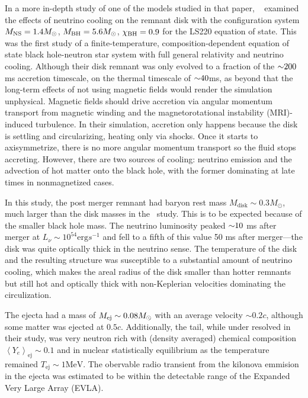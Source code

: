 In a more in-depth study of one of the models studied in that paper, ~\cite{Deaton2013} examined the effects of neutrino cooling on the remnant disk with the configuration system $M_{\rm NS} = 1.4 M_\odot$, $M_{\rm BH} = 5.6 M_\odot$, $\chi_{\rm BH} = 0.9$ for the LS220 equation of state.  
This was the first study of a finite-temperature, composition-dependent equation of state black hole-neutron star system with full general relativity and neutrino cooling.  
Although their disk remnant was only evolved to a fraction of the $\mathord{\sim} 200$ms accretion timescale, on the thermal timescale of $\mathord{\sim} 40$ms, as beyond that the long-term effects of not using magnetic fields would render the simulation unphysical.
Magnetic fields should drive accretion via angular momentum transport from magnetic winding and the magnetorotational instability (MRI)-induced turbulence.
In their simulation, accretion only happens because the disk is settling and circularizing, heating only via shocks.
Once it starts to axisymmetrize, there is no more angular momentum transport so the fluid stops accreting. 
However, there are two sources of cooling: neutrino emission and the advection of hot matter onto the black hole, with the former dominating at late times in nonmagnetized cases.

In this study, the post merger remnant had baryon rest mass $M_\textrm{disk} \sim 0.3 M_\odot$, much larger than the disk masses in the~\cite{Foucart:2014nda} study.  
This is to be expected because of the smaller black hole mass.
The neutrino luminosity peaked $\mathord{\sim} 10$ ms after merger at $L_\nu \sim 10^{54} \textrm{erg} s^{-1}$ and fell to a fifth of this value 50 ms after merger---the disk was quite optically thick in the neutrino sense.  The temperature of the disk and the resulting structure was susceptible to a substantial amount of neutrino cooling, which makes the areal radius of the disk smaller than hotter remnants but still hot and optically thick with non-Keplerian velocities dominating the circulization.

The ejecta had a mass of $M_{\rm ej} \sim 0.08 M_\odot$ with an average velocity $\sim 0.2 c$, although some matter was ejected at $0.5 c$. Additionally, the tail, while under resolved in their study, was very neutron rich with (density averaged) chemical composition $\left\langle Y_e \right\rangle_\textrm{ej} \sim 0.1$  and in nuclear statistically equilibrium as the temperature remained $T_\textrm{ej} \sim 1 \textrm{MeV}$.  The obervable radio transient from the kilonova emmision in the ejecta was estimated to be within the detectable range of the Expanded Very Large Array (EVLA).


